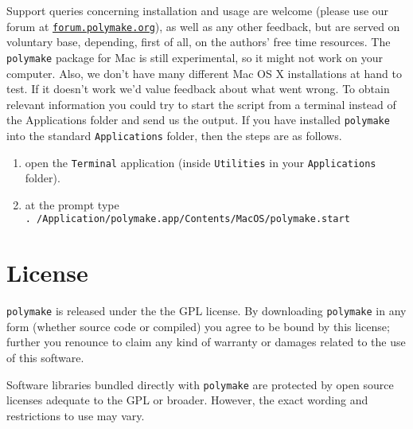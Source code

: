\documentclass[a4paper]{amsart}
\newcommand{\polymake}{\texttt{polymake}\xspace}
\begin{document}
Support queries concerning installation and usage are welcome (please use our forum at \href{http://forum.polymake.org}{\tt forum.polymake.org}), as well as any other feedback, but are served on voluntary base, depending, first of all, on the authors' free time resources.  The \polymake package for Mac is still experimental, so it might not work on your computer. Also, we don't have many different Mac OS X installations at hand to test. If it doesn't work we'd value feedback about what went wrong. To obtain relevant information you could try to start the script from a terminal instead of the Applications folder and send us the output. If you have installed \polymake into the standard \texttt{Applications} folder, then the steps are as follows.
\begin{enumerate}
\item open the \texttt{Terminal} application (inside \texttt{Utilities} in your \texttt{Applications} folder).
\item at the prompt type\\
 \texttt{. /Application/polymake.app/Contents/MacOS/polymake.start}
\end{enumerate}

\section*{License}

\polymake is released under the the GPL license. By downloading \polymake in any form (whether source code or compiled) you agree to be bound by this license; further you renounce to claim any kind of warranty or damages related to the use of this software.

Software libraries bundled directly with \polymake are protected by open source licenses adequate to the GPL or broader. However, the exact wording and restrictions to use may vary. 
\end{document}
